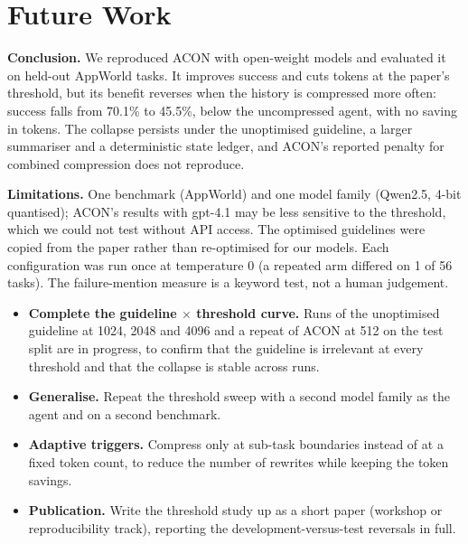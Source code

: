 \documentclass[10pt,a4paper]{article}
\begin{document}
\section{Future Work}

\textbf{Conclusion.} We reproduced ACON with open-weight models and evaluated
it on held-out AppWorld tasks. It improves success and cuts tokens at the
paper's threshold, but its benefit reverses when the history is compressed more
often: success falls from 70.1\% to 45.5\%, below the uncompressed agent, with no
saving in tokens. The collapse persists under the unoptimised guideline, a
larger summariser and a deterministic state ledger, and ACON's reported penalty
for combined compression does not reproduce.

\textbf{Limitations.} One benchmark (AppWorld) and one model family (Qwen2.5,
4-bit quantised); ACON's results with gpt-4.1 may be less sensitive to the
threshold, which we could not test without API access. The optimised guidelines
were copied from the paper rather than re-optimised for our models. Each
configuration was run once at temperature 0 (a repeated arm differed on 1 of 56
tasks). The failure-mention measure is a keyword test, not a human judgement.

\begin{itemize}
\item \textbf{Complete the guideline $\times$ threshold curve.} Runs of the
unoptimised guideline at 1024, 2048 and 4096 and a repeat of ACON at 512 on the
test split are in progress, to confirm that the guideline is irrelevant at every
threshold and that the collapse is stable across runs.
\item \textbf{Generalise.} Repeat the threshold sweep with a second model family
as the agent and on a second benchmark.
\item \textbf{Adaptive triggers.} Compress only at sub-task boundaries instead of
at a fixed token count, to reduce the number of rewrites while keeping the
token savings.
\item \textbf{Publication.} Write the threshold study up as a short paper
(workshop or reproducibility track), reporting the development-versus-test
reversals in full.
\end{itemize}
\end{document}
